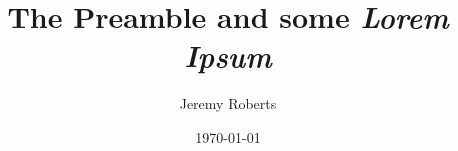 \documentclass{article}
\title{The Preamble and
       some {\it Lorem Ipsum}}
\author{Jeremy Roberts}
\date{\today}
\begin{document}
\maketitle
\Blinddocument
\end{document}
